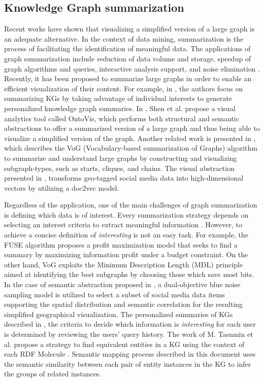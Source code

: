 \documentclass{ieeeaccess}
\begin{document}
\subsection{Knowledge Graph summarization}

Recent works \cite{6787141,1703364,8801911}
have shown that visualizing a simplified version of a large graph is an
adequate alternative. In the context of data mining, summarization is the
process of facilitating the identification of meaningful data. The
applications of graph summarization include reduction of data
volume and storage, speedup of graph algorithms and queries, interactive
analysis support, and noise elimination \cite{liu2018graph}. Recently, it
has been proposed to summarize large graphs in order 
to enable an efficient visualization of their content. For example, in 
\cite{Koutra2019}, the authors focus on summarizing KGs by taking
advantage of individual interests to generate personalized knowledge graph
summaries. In \cite{OntoVis}, Shen et al. propose a visual 
analytics tool called OntoVis, which performs both structural and semantic
abstractions to offer a summarized version of a large graph and thus
being able to visualize a simplified version of the graph. Another
related work is presented in \cite{koutra2014vog}, which describes the VoG
(Vocabulary-based summarization of Graphs) algorithm to summarize and
understand large graphs by constructing and visualizing subgraph-types, 
such as starts, cliques, and chains. The visual abstraction presented in
\cite{8801911}, transforms geo-tagged social media data into high-dimensional
vectors by utilizing a doc2vec model.

Regardless of the application, one of the main challenges of
graph summarization is defining which data is of interest. Every
summarization strategy depends on selecting an interest criteria to
extract meaningful information \cite{liu2018graph}. However, to achieve a 
concise definition of \textit{interesting} is not an easy task. For
example, the FUSE algorithm \cite {Seah12} proposes a profit maximization
model that seeks to find a summary by maximizing information profit under
a budget constraint. On the other hand, VoG \cite{koutra2014vog} exploits
the Minimum Description Length (MDL) principle aimed at identifying the
best subgraphs by choosing those which save most bits. In the case of
semantic abstraction proposed in \cite{8801911}, a dual-objective blue 
noise sampling model is utilized to select a subset of social media data
items supporting the spatial distribution and semantic correlation for
the resulting simplified geographical visualization. The personalized 
summaries of KGs described in \cite{Koutra2019}, the criteria to decide 
which information is \textit{interesting} for each user is determined by
reviewing the users' query history. The work of M. Tasnmin et al. 
propose a strategy to find equivalent entities in a KG using the context 
of each RDF Molecule \cite{Tasnim2020}. Semantic mapping process described
in this document uses the semantic similarity between each pair of entity
instances in the KG to infer the groups of related instances.
\end{document}
